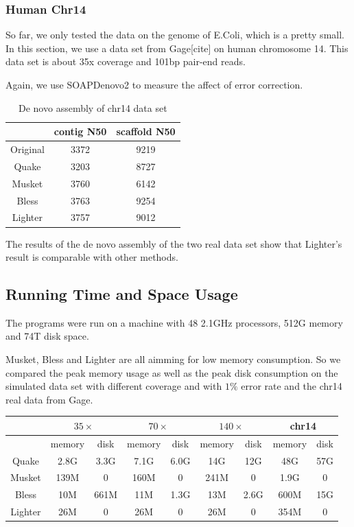 \documentclass[10pt]{article}
\begin{document}
\subsubsection*{Human Chr14}
So far, we only tested the data on the genome of E.Coli, which is a pretty small. In this section, we use a data set from Gage[cite] on human chromosome 14. This data set is about 35x coverage and 101bp pair-end reads.

Again, we use SOAPDenovo2 to measure the affect of error correction. 

\begin{table}
\begin{tabular}{|c|c|c|} \hline
		& contig N50	& scaffold N50 \\ \hline
Original	& 3372	& 9219 \\ \hline
Quake	& 3203	& 8727 \\ \hline
Musket	& 3760	& 6142 \\ \hline
Bless	& 3763	& 9254 \\ \hline
Lighter	&  3757	& 9012 \\ \hline
\end{tabular}
\caption{De novo assembly of chr14 data set\label{table:chr14}}
\end{table}

The results of the de novo assembly of the two real data set show that Lighter's result is comparable with other methods.

\subsection*{Running Time and Space Usage}
The programs were run on a machine with 48 2.1GHz processors, 512G memory and 74T disk space. 

Musket, Bless and Lighter are all aimming for low memory consumption. So we compared the peak memory usage as well as the peak disk consumption on the simulated data set with different coverage and with $1\%$ error rate and the chr14 real data from Gage.

\begin{tabular}{|c|c|c||c|c||c|c||c|c|} \hline
		& \multicolumn{2}{|c||}{$35\times$} & \multicolumn{2}{|c||}{$70\times$}  & \multicolumn{2}{|c||}{$140\times$} & \multicolumn{2}{|c|}{chr14}  \\ \hline
		& memory & disk & memory & disk & memory & disk & memory & disk \\ \hline
Quake   & 2.8G	& 3.3G & 7.1G & 6.0G & 14G & 12G & 48G & 57G \\ \hline		
Musket	& 139M	& 0 & 160M & 0 & 241M & 0 & 1.9G & 0 \\ \hline
Bless	& 10M	& 661M & 11M & 1.3G & 13M & 2.6G & 600M & 15G \\ \hline
Lighter	& 26M	& 0 & 26M & 0 & 26M & 0 & 354M & 0 \\ \hline
\end{tabular}
\end{document}

